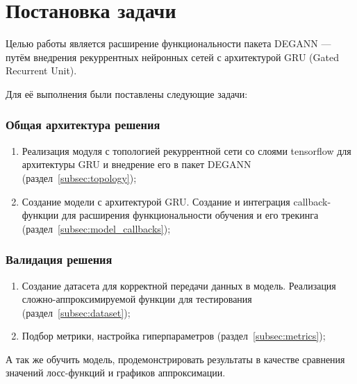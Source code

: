 
\section{Постановка задачи}
\label{sec:task}

Целью работы является расширение функциональности пакета DEGANN\cite{degann} --- путём внедрения рекуррентных нейронных сетей с архитектурой GRU (Gated Recurrent Unit)\cite{gru}.

Для её выполнения были поставлены следующие задачи:
\subsubsection*{Общая архитектура решения}
\begin{enumerate}
    \item Реализация модуля с топологией рекуррентной сети со слоями tensorflow для архитектуры GRU и внедрение его в пакет DEGANN (раздел~\ref{subsec:topology});
    \item Создание модели с архитектурой GRU. Создание и интеграция callback-функции для расширения функциональности обучения и его трекинга (раздел~\ref{subsec:model_callbacks});
\end{enumerate}

\subsubsection*{Валидация решения}
\begin{enumerate}
    \item Создание датасета для корректной передачи данных в модель. Реализация сложно-аппроксимируемой функции для тестирования (раздел~\ref{subsec:dataset});
    \item Подбор метрики, настройка гиперпараметров (раздел~\ref{subsec:metrics});
\end{enumerate}

А так же обучить модель, продемонстрировать результаты в качестве сравнения значений лосс-функций и графиков аппроксимации.